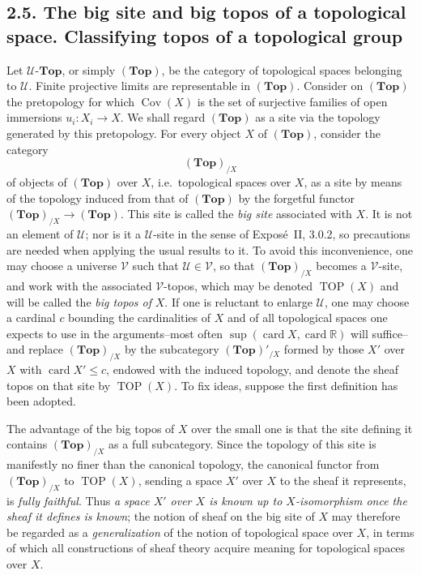 \documentclass[11pt]{article}
\newcommand{\U}{\mathcal{U}}
\newcommand{\V}{\mathcal{V}}
\newcommand{\Esp}{\mathbf{Top}}
\newcommand{\TOP}{\operatorname{TOP}}
\newcommand{\Cov}{\operatorname{Cov}}
\newcommand{\ie}{i.e.}
\begin{document}
\subsection*{2.5. The big site and big topos of a topological space. Classifying topos of a topological group}
Let \(\U\text{-}\Esp\), or simply \((\Esp)\), be the category of topological spaces belonging to \(\U\). Finite projective limits are representable in \((\Esp)\). Consider on \((\Esp)\) the pretopology for which \(\Cov(X)\) is the set of surjective families of open immersions \(u_i:X_i\to X\). We shall regard \((\Esp)\) as a site via the topology generated by this pretopology. For every object \(X\) of \((\Esp)\), consider the category
\[
(\Esp)_{/X}
\]
of objects of \((\Esp)\) over \(X\), \ie\ topological spaces over \(X\), as a site by means of the topology induced from that of \((\Esp)\) by the forgetful functor \((\Esp)_{/X}\to(\Esp)\). This site is called the \emph{big site} associated with \(X\). It is not an element of \(\U\); nor is it a \(\U\)-site in the sense of Expos\'e~II, 3.0.2, so precautions are needed when applying the usual results to it. To avoid this inconvenience, one may choose a universe \(\V\) such that \(\U\in\V\), so that \((\Esp)_{/X}\) becomes a \(\V\)-site, and work with the associated \(\V\)-topos, which may be denoted \(\TOP(X)\) and will be called the \emph{big topos of} \(X\). If one is reluctant to enlarge \(\U\), one may choose a cardinal \(c\) bounding the cardinalities of \(X\) and of all topological spaces one expects to use in the arguments--most often \(\sup(\operatorname{card}X,\operatorname{card}\mathbb R)\) will suffice--and replace \((\Esp)_{/X}\) by the subcategory \((\Esp)'_{/X}\) formed by those \(X'\) over \(X\) with \(\operatorname{card}X'\le c\), endowed with the induced topology, and denote the sheaf topos on that site by \(\TOP(X)\). To fix ideas, suppose the first definition has been adopted.

The advantage of the big topos of \(X\) over the small one is that the site defining it contains \((\Esp)_{/X}\) as a full subcategory. Since the topology of this site is manifestly no finer than the canonical topology, the canonical functor from \((\Esp)_{/X}\) to \(\TOP(X)\), sending a space \(X'\) over \(X\) to the sheaf it represents, is \emph{fully faithful}. Thus \emph{a space \(X'\) over \(X\) is known up to \(X\)-isomorphism once the sheaf it defines is known}; the notion of sheaf on the big site of \(X\) may therefore be regarded as a \emph{generalization} of the notion of topological space over \(X\), in terms of which all constructions of sheaf theory acquire meaning for topological spaces over \(X\).
\end{document}
